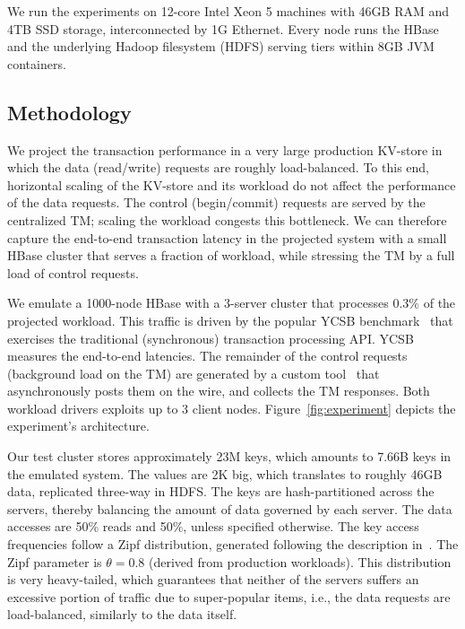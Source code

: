 We run the experiments on 12-core Intel Xeon 5 machines with 46GB RAM and 4TB 
SSD storage, interconnected by 1G Ethernet.  Every node runs the HBase and the underlying 
Hadoop filesystem (HDFS) serving tiers within 8GB JVM containers. 

\subsection{Methodology}
We project the transaction performance in a very large production KV-store in which the data (read/write) 
requests are roughly load-balanced. To this end, horizontal scaling of the KV-store and its workload do not 
affect the performance of the data requests. The control (begin/commit) requests are served by the centralized 
TM; scaling the workload congests this bottleneck. We can therefore capture the end-to-end transaction latency
in the projected system with a small HBase cluster that serves a fraction of workload, while stressing the TM 
by a full load of control requests. 

We emulate a 1000-node HBase with a 3-server cluster that processes $0.3\%$ of the projected workload. 
This traffic is driven by the popular YCSB benchmark~\cite{Cooper:2010:BCS:1807128.1807152} 
that exercises the traditional (synchronous) transaction processing API. YCSB measures the end-to-end latencies.
The remainder of the control requests (background load on the TM) are generated by a custom tool~\cite{Omid2017} 
that asynchronously posts them on the wire, and collects the TM responses. Both workload
drivers exploits up to 3 client nodes. Figure~\ref{fig:experiment} depicts the experiment's architecture. 

Our test cluster stores approximately 23M keys, which amounts to 7.66B keys in the emulated system. 
The values are 2K big, which translates to roughly 46GB data, replicated three-way in HDFS. The keys are hash-partitioned
across the servers, thereby balancing the amount of data governed by each server. The data accesses are 50\% reads and 
50\%, unless specified otherwise. The key access frequencies follow a Zipf distribution, generated following 
the description in~\cite{Gray:1994:QGB:191839.191886}. The Zipf parameter is $\theta=0.8$ (derived from production workloads). 
This distribution is very heavy-tailed, which guarantees that neither of the servers suffers an excessive portion of traffic 
due to super-popular items, i.e., the data requests are load-balanced, similarly to the data itself.  

